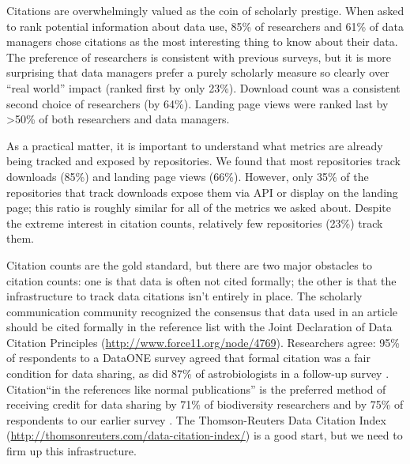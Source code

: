 \documentclass[english]{article}
\begin{document}

Citations are overwhelmingly valued as the coin of scholarly prestige. 
When asked to rank potential information about data use, 85\% of researchers and 61\% of data managers chose citations as the most interesting thing to know about their data. 
The preference of researchers is consistent with previous surveys\cite{@kratz_researcher_2015}, but it is more surprising that data managers prefer a purely scholarly measure so clearly over ``real world'' impact (ranked first by only 23\%). 
Download count was a consistent second choice of researchers (by 64\%). 
Landing page views were ranked last by >50\% of both researchers and data managers.

As a practical matter, it is important to understand what metrics are already being tracked and exposed by repositories. 
We found that most repositories track downloads (85\%) and landing page views (66\%). 
However, only 35\% of the repositories that track downloads expose them via API or display on the landing page; this ratio is roughly similar for all of the metrics we asked about. 
Despite the extreme interest in citation counts, relatively few repositories (23\%) track them. 


Citation counts are the gold standard, but there  are two major obstacles to citation counts: one is that data is often not cited formally; the other is that the infrastructure to track data citations isn't entirely in place.
The scholarly communication community recognized the consensus that data used in an article should be cited formally in the reference list with the Joint Declaration of Data Citation Principles (\url{http://www.force11.org/node/4769}). 
Researchers agree: 95\% of respondents to a DataONE survey agreed that formal citation was a fair condition for data sharing, as did 87\% of astrobiologists in a follow-up survey \cite{@tenopir_data_2011, @aydinoglu_data_2014}. 
Citation``in the references like normal publications'' is the preferred method of receiving credit for data sharing by 71\% of biodiversity researchers and by 75\% of respondents to our earlier survey \cite{@enke_users_2012, @kratz_researcher_2015}.
The Thomson-Reuters Data Citation Index (\url{http://thomsonreuters.com/data-citation-index/}) is a good start, but we need to firm up this infrastructure.
\end{document}
